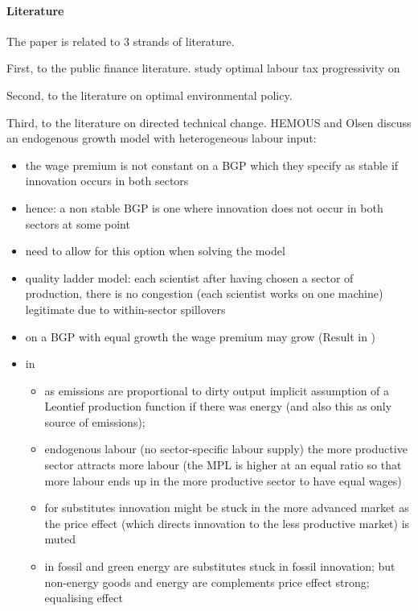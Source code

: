 \paragraph{Literature}

The paper is related to 3 strands of literature. 

First, to the public finance literature.  \cite{Heathcote2017OptimalFramework} study optimal labour tax progressivity on 



Second, to the literature on optimal environmental policy. 

Third, to the literature on directed technical change. 
HEMOUS and Olsen discuss an endogenous growth model with heterogeneous labour input:
\begin{itemize}
	\item the wage premium is not constant on a BGP which they specify as stable if innovation occurs in both sectors
	\item hence: a non stable BGP is one where innovation does not occur in both sectors at some point
	\item need to allow for this option when solving the model
	\item quality ladder model: each scientist after having chosen a sector of production, there is no congestion (each scientist works on one machine) legitimate due to within-sector spillovers
	\item on a BGP with equal growth the wage premium may grow (Result in \cite{Acemoglu2002DirectedChange}) 
	\item in \cite{Acemoglu2012TheChange} 
	\begin{itemize}
		\item as emissions are proportional to dirty output implicit assumption of a Leontief production function if there was energy (and also this as only source of emissions); 
		 \item endogenous labour (no sector-specific labour supply) \ar the more productive sector attracts more labour (the MPL is higher at an equal ratio so that more labour ends up in the more productive sector to have equal wages)
		 \item for substitutes innovation might be stuck in the more advanced market as the price effect (which directs innovation to the less productive market) is muted
		 \item[\ar] in \cite{Fried2018ClimateAnalysis} fossil and green energy are substitutes \ar stuck in fossil innovation; but non-energy goods and energy are complements \ar price effect strong; equalising effect

\end{itemize}
\end{itemize}
